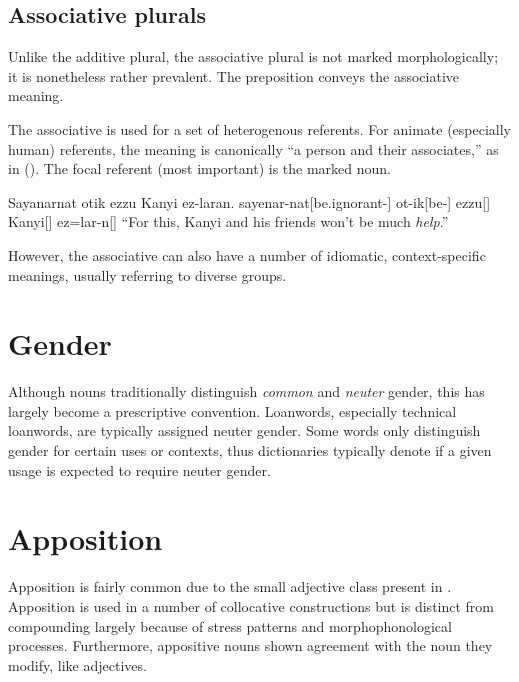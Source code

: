 \subsection{Associative plurals}
Unlike the additive plural, the associative plural is not marked morphologically; it is nonetheless rather prevalent. The preposition  conveys the associative meaning.

The associative is used for a set of heterogenous referents. For animate (especially human) referents, the meaning is canonically “a person and their associates,” as in (\nextx). The focal referent (\ie most important) is the marked noun.

\begin{gloss}
    \begingl
        \glpreamble Sayanarnat otik ezzu Kanyi ez-laran. \endpreamble
            sayenar-nat[be.ignorant-]
            ot-ik[be-]
            ezzu[]
            Kanyi[]
            ez=lar-n[]
        \glft “For this, Kanyi and his friends won't be much \emph{help}.”
    \endgl
\end{gloss}

However, the associative can also have a number of idiomatic, context-specific meanings, usually referring to diverse groups.


\section{Gender}
Although nouns traditionally distinguish \emph{common} and \emph{neuter} gender, this has largely become a prescriptive convention.  Loanwords, especially technical loanwords, are typically assigned neuter gender. Some words only distinguish gender for certain uses or contexts, thus dictionaries typically denote if a given usage is expected to require neuter gender.

\section{Apposition}
Apposition is fairly common due to the small adjective class present in \langname{}. Apposition is used in a number of collocative constructions but is distinct from compounding largely because of stress patterns and morphophonological processes. Furthermore, appositive nouns shown agreement with the noun they modify, like adjectives.

